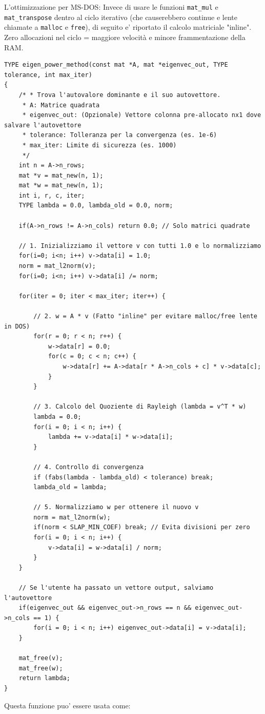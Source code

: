 \documentclass[10pt]{article}
\begin{document}
L'ottimizzazione per MS-DOS: Invece di usare le funzioni \texttt{mat\_mul} e \texttt{mat\_transpose} dentro al ciclo iterativo (che causerebbero continue e lente chiamate a \texttt{malloc} e \texttt{free}), di seguito e' riportato il calcolo matriciale "inline". Zero allocazioni nel ciclo = maggiore velocità e minore frammentazione della RAM.
\begin{lstlisting}
TYPE eigen_power_method(const mat *A, mat *eigenvec_out, TYPE tolerance, int max_iter) 
{
	/* * Trova l'autovalore dominante e il suo autovettore.
	 * A: Matrice quadrata
	 * eigenvec_out: (Opzionale) Vettore colonna pre-allocato nx1 dove salvare l'autovettore
	 * tolerance: Tolleranza per la convergenza (es. 1e-6)
	 * max_iter: Limite di sicurezza (es. 1000)
	 */
	int n = A->n_rows;
	mat *v = mat_new(n, 1);
	mat *w = mat_new(n, 1);
	int i, r, c, iter;
	TYPE lambda = 0.0, lambda_old = 0.0, norm;

	if(A->n_rows != A->n_cols) return 0.0; // Solo matrici quadrate

	// 1. Inizializziamo il vettore v con tutti 1.0 e lo normalizziamo
	for(i=0; i<n; i++) v->data[i] = 1.0;
	norm = mat_l2norm(v);
	for(i=0; i<n; i++) v->data[i] /= norm;

	for(iter = 0; iter < max_iter; iter++) {
		
		// 2. w = A * v (Fatto "inline" per evitare malloc/free lente in DOS)
		for(r = 0; r < n; r++) {
			w->data[r] = 0.0;
			for(c = 0; c < n; c++) {
				w->data[r] += A->data[r * A->n_cols + c] * v->data[c];
			}
		}

		// 3. Calcolo del Quoziente di Rayleigh (lambda = v^T * w)
		lambda = 0.0;
		for(i = 0; i < n; i++) {
			lambda += v->data[i] * w->data[i];
		}

		// 4. Controllo di convergenza
		if (fabs(lambda - lambda_old) < tolerance) break;
		lambda_old = lambda;

		// 5. Normalizziamo w per ottenere il nuovo v
		norm = mat_l2norm(w);
		if(norm < SLAP_MIN_COEF) break; // Evita divisioni per zero
		for(i = 0; i < n; i++) {
			v->data[i] = w->data[i] / norm;
		}
	}

	// Se l'utente ha passato un vettore output, salviamo l'autovettore
	if(eigenvec_out && eigenvec_out->n_rows == n && eigenvec_out->n_cols == 1) {
		for(i = 0; i < n; i++) eigenvec_out->data[i] = v->data[i];
	}

	mat_free(v);
	mat_free(w);
	return lambda;
}
\end{lstlisting}
Questa funzione puo' essere usata come:
\end{document}
